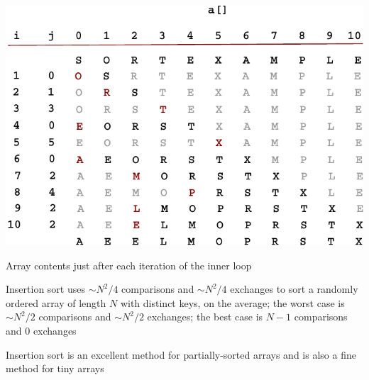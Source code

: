 \documentclass[8pt,a4paper,compress]{beamer}
\begin{document}
\begin{frame}[fragile]
\begin{center}
\includegraphics[scale=0.65]{./figures/insertion_trace.pdf}

\smallskip

Array contents just after each iteration of the inner loop
\end{center}
\end{frame}

\begin{frame}[fragile]
Insertion sort uses $\sim N^2 /4$ comparisons and $\sim N^2 /4$ exchanges to sort a randomly ordered array of length $N$ with distinct keys, on the average; the worst case is $\sim N^2 /2$ comparisons and $\sim N^2/2$ exchanges; the best case is $N-1$ comparisons and 0 exchanges

\bigskip

Insertion sort is an excellent method for partially-sorted arrays and is also a fine method for tiny arrays
\end{frame}
\end{document}
